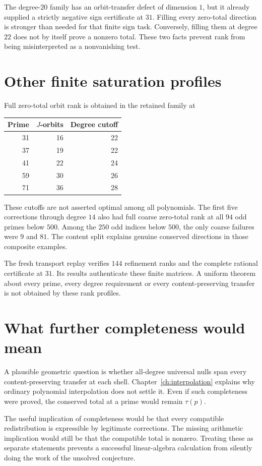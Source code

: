 The degree-$20$ family has an orbit-transfer defect of dimension $1$, but it already supplied a strictly negative sign certificate at $31$. Filling every zero-total direction is stronger than needed for that finite sign task. Conversely, filling them at degree $22$ does not by itself prove a nonzero total. These two facts prevent rank from being misinterpreted as a nonvanishing test.


\section{Other finite saturation profiles}
Full zero-total orbit rank is obtained in the retained family at
\begin{center}
\begin{tabular}{rrr}
\toprule
Prime&$J$-orbits&Degree cutoff\\
\midrule
31&16&22\\
37&19&22\\
41&22&24\\
59&30&26\\
71&36&28\\
\bottomrule
\end{tabular}
\end{center}
These cutoffs are not asserted optimal among all polynomials. The first five corrections through degree $14$ also had full coarse zero-total rank at all $94$ odd primes below $500$. Among the $250$ odd indices below $500$, the only coarse failures were $9$ and $81$. The content split explains genuine conserved directions in those composite examples.

The fresh transport replay verifies $144$ refinement ranks and the complete rational certificate at $31$. Its results authenticate these finite matrices. A uniform theorem about every prime, every degree requirement or every content-preserving transfer is not obtained by these rank profiles.

\section{What further completeness would mean}
A plausible geometric question is whether all-degree universal nulls span every content-preserving transfer at each shell. Chapter~\ref{ch:interpolation} explains why ordinary polynomial interpolation does not settle it. Even if such completeness were proved, the conserved total at a prime would remain $\tau(p)$.

The useful implication of completeness would be that every compatible redistribution is expressible by legitimate corrections. The missing arithmetic implication would still be that the compatible total is nonzero. Treating these as separate statements prevents a successful linear-algebra calculation from silently doing the work of the unsolved conjecture.
